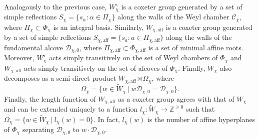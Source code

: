 \documentclass{article}
\newcommand{\aff}{\mathrm{aff}}
\newcommand{\ZZ}{\mathbb{Z}}
\theoremstyle{plain}
\theoremstyle{definition}
\begin{document}
    Analogously to the previous case, $W_\chi^\circ$ is a coxeter group generated by a set of simple reflections $S_\chi=\{s_\alpha:\alpha\in\Pi_\chi\}$ along the walls of the Weyl chamber $\mathcal{C}_\chi$, where $\Pi_\chi\subset\Phi_\chi$ is an integral basis. Similarly, $W_{\chi,\aff}$ is a coxeter group generated by a set of simple reflections $S_{\chi,\aff}=\{s_a:a\in\Pi_{\chi,\aff}\}$ along the walls of the fundamental alcove $\mathcal{D}_{\chi,0}$, where $\Pi_{\chi,\aff}\subset\Phi_{\chi,\aff}$ is a set of minimal affine roots. Moreover, $W_\chi^\circ$ acts simply transitively on the set of Weyl chambers of $\Phi_\chi$ and $W_{\chi,\aff}$ acts simply transitively on the set of alcoves of $\Phi_\chi$. Finally, $\tilde{W}_\chi$ also decomposes as a semi-direct product $W_{\chi,\aff}\rtimes\Omega_\chi$, where %
    $$\Omega_\chi=\{w\in\tilde{W}_\chi\ |\ w\mathcal{D}_{\chi,0}=\mathcal{D}_{\chi,0}\}.$$
    Finally, the length function of $W_{\chi,\aff}$ as a coxeter group agrees with that of $W_\chi$ and can be extended uniquely to a function $l_\chi:\tilde{W}_\chi\rightarrow\ZZ^{\geq0}$ such that $\Omega_\chi=\{w\in\tilde{W}_\chi\ |\ l_\chi(w)=0\}$. In fact, $l_\chi(w)$ is the number of affine hyperplanes of $\Phi_\chi$ separating $\mathcal{D}_{\chi,0}$ to $w\cdot\mathcal{D}_{\chi,0}$.
\end{document}
